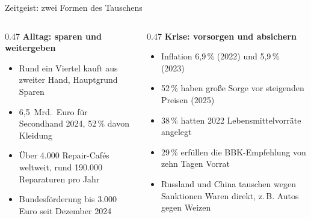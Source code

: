 \documentclass[aspectratio=169, 11pt]{beamer}
\begin{document}
\begin{frame}{Zeitgeist: zwei Formen des Tauschens}
    \begin{columns}[T]
        \begin{column}{0.47\textwidth}
            {\color{clC}\bfseries Alltag: sparen und weitergeben}
            \begin{itemize}\small
                \item Rund ein Viertel kauft aus zweiter Hand, Hauptgrund
                      Sparen~\cite{idealo2024}
                \item 6,5~Mrd.\ Euro für Secondhand 2024, 52\,\% davon
                      Kleidung~\cite{cebr2025}
                \item Über 4.000 Repair-Cafés weltweit, rund 190.000
                      Reparaturen pro Jahr~\cite{nltimes2024}
                \item Bundesförderung bis 3.000 Euro seit Dezember
                      2024~\cite{heise2024}
            \end{itemize}
        \end{column}
        \begin{column}{0.47\textwidth}
            {\color{clD}\bfseries Krise: vorsorgen und absichern}
            \begin{itemize}\small
                \item Inflation 6,9\,\% (2022) und 5,9\,\% (2023)~\cite{statistikportal}
                \item 52\,\% haben große Sorge vor steigenden Preisen
                      (2025)~\cite{ruv2025}
                \item 38\,\% hatten 2022 Lebensmittelvorräte
                      angelegt~\cite{lmpraxis2022}
                \item 29\,\% erfüllen die BBK-Empfehlung von zehn Tagen
                      Vorrat~\cite{stuttgart2024}
                \item Russland und China tauschen wegen Sanktionen Waren direkt,
                      z.\,B. Autos gegen Weizen~\cite{reuters2025}
            \end{itemize}
        \end{column}
    \end{columns}
\end{frame}
\end{document}
